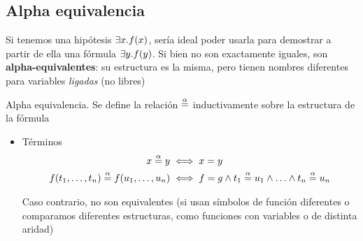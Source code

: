 
\subsection{Alpha equivalencia}

Si tenemos una hipótesis $\exists x . f(x)$, sería ideal poder usarla para demostrar a partir de ella una fórmula $\exists y . f(y)$. Si bien no son exactamente iguales, son \textbf{alpha-equivalentes}: su estructura es la misma, pero tienen nombres diferentes para variables \textit{ligadas} (no libres)

\begin{definition}{Alpha equivalencia}. Se define la relación $\overset{\alpha}{=}$ inductivamente sobre la estructura de la fórmula
    \begin{itemize}
        \item Términos
        \begin{align*}
            x \overset{\alpha}{=} y &\iff x = y\\
            f(t_1, \dots, t_n)
            \overset{\alpha}{=}
            f(u_1, \dots, u_n)
            &\iff f = g \wedge
                t_1 \overset{\alpha}{=} u_1 \wedge
                \dotso \wedge
                t_n \overset{\alpha}{=} u_n
        \end{align*}

        Caso contrario, no son equivalentes (si usan símbolos de función diferentes o comparamos diferentes estructuras, como funciones con variables o de distinta aridad) 
    

\end{itemize}
\end{definition}
